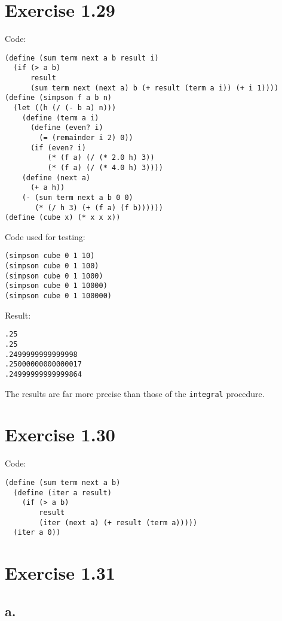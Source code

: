 \documentclass[../main.tex]{subfiles}
\begin{document}
\section{Exercise 1.29}

Code:

\begin{lstlisting}
(define (sum term next a b result i)
  (if (> a b)
      result
      (sum term next (next a) b (+ result (term a i)) (+ i 1))))
(define (simpson f a b n)
  (let ((h (/ (- b a) n)))
    (define (term a i)
      (define (even? i)
        (= (remainder i 2) 0))
      (if (even? i)
          (* (f a) (/ (* 2.0 h) 3))
          (* (f a) (/ (* 4.0 h) 3))))
    (define (next a)
      (+ a h))
    (- (sum term next a b 0 0)
       (* (/ h 3) (+ (f a) (f b))))))
(define (cube x) (* x x x))
\end{lstlisting}

Code used for testing:

\begin{lstlisting}
(simpson cube 0 1 10)
(simpson cube 0 1 100)
(simpson cube 0 1 1000)
(simpson cube 0 1 10000)
(simpson cube 0 1 100000)
\end{lstlisting}

Result:

\begin{lstlisting}
.25
.25
.2499999999999998
.25000000000000017
.24999999999999864
\end{lstlisting}

The results are far more precise than
 those of the \lstinline{integral}
 procedure.

\section{Exercise 1.30}

Code:

\begin{lstlisting}
(define (sum term next a b)
  (define (iter a result)
    (if (> a b)
        result
        (iter (next a) (+ result (term a)))))
  (iter a 0))
\end{lstlisting}

\section{Exercise 1.31}

\subsection*{a.}
\end{document}
